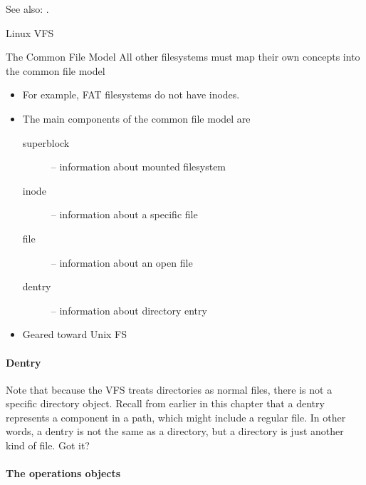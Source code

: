 See also: .

\begin{frame}{Linux VFS}
  \begin{block}{The Common File Model}
    All other filesystems must map their own concepts into the common file model
    \begin{itemize}
    \item[] For example, FAT filesystems do not have inodes. 
    \end{itemize}
  \end{block}
  \begin{itemize}
  \item The main components of the common file model are
    \begin{description}
    \item[superblock] -- information about mounted filesystem
    \item[inode] -- information about a specific file
    \item[file] -- information about an open file
    \item[dentry] -- information about directory entry
    \end{description}
  \item Geared toward Unix FS
  \end{itemize}
\end{frame}

\paragraph{Dentry}

Note that because the VFS treats directories as normal files, there is not a specific
directory object. Recall from earlier in this chapter that a dentry represents a component
in a path, which might include a regular file. In other words, a dentry is not the same as
a directory, but a directory is just another kind of file. Got it?

\paragraph{The operations objects}

